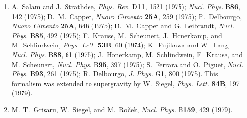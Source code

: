 


\begin{enumerate}
  \item {}\label{ch30-ref-1}
  A.~Salam and J.~Strathdee, \textit{Phys. Rev.} D\textbf{11}, 1521
  (1975); \textit{Nucl. Phys.} B\textbf{86}, 142 (1975); D.~M.~Capper,
  \textit{Nuovo Cimento} \textbf{25A}, 259 (1975); R.~Delbourgo,
  \textit{Nuovo Cimento} \textbf{25A}, 646 (1975); D.~M.~Capper and
  G.~Leibrandt, \textit{Nucl. Phys.} B\textbf{85}, 492 (1975);
  F.~Krause, M.~Scheunert, J.~Honerkamp, and M.~Schlindwein,
  \textit{Phys. Lett.} \textbf{53B}, 60 (1974); K.~Fujikawa and
  W.~Lang, \textit{Nucl. Phys.} B\textbf{88}, 61 (1975); J.~Honerkamp,
  M.~Schlindwein, F.~Krause, and M.~Scheunert, \textit{Nucl. Phys.}
  B\textbf{95}, 397 (1975); S.~Ferrara and O.~Piguet,
  \textit{Nucl. Phys.} B\textbf{93}, 261 (1975); R.~Delbourgo,
  \textit{J. Phys.} G\textbf{1}, 800 (1975). This formalism was
  extended to supergravity by W.~Siegel, \textit{Phys. Lett.}
  \textbf{84B}, 197 (1979).

  \item {}\label{ch30-ref-2}
  M.~T.~Grisaru, W.~Siegel, and M.~Ro\v{c}ek,
  \textit{Nucl. Phys.} B\textbf{159}, 429 (1979).
\end{enumerate}
